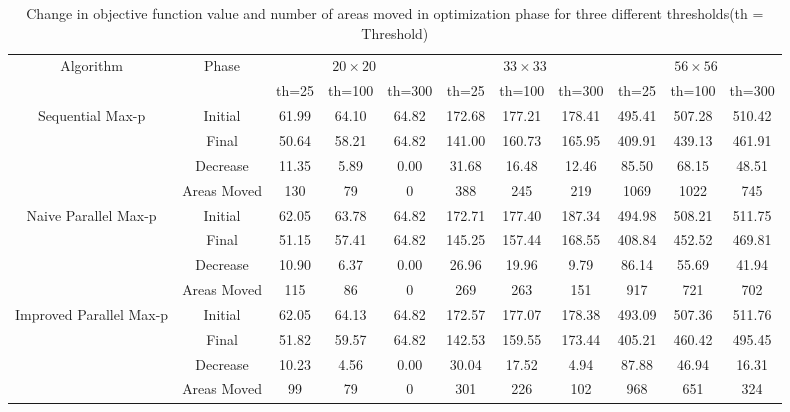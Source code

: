 \documentclass[conference]{IEEEtran}
\begin{document}
\begin{table}[!htbp]
\begin{center}
\begin{tabular}{|c|c|c|c|c|c|c|c|c|c|c|}
\hline 
\multirow{2}{*}{Algorithm}&\multirow{2}{*}{Phase} & \multicolumn{3}{|c|}{$20\times 20$} & \multicolumn{3}{|c|}{$33\times33$} & \multicolumn{3}{|c|}{$56\times56$}\\
\cline{3-11}
	& & th=25 & th=100 & th=300  & th=25 & th=100 & th=300  & th=25 & th=100 & th=300\\
\cline{1-11}
\multirow{3}{*}{Sequential Max-p}& Initial  & 61.99& 64.10 & 64.82 & 172.68 & 177.21 &178.41 &495.41 &507.28 &510.42 \\
\cline{2-11}
 & Final& 50.64 & 58.21 & 64.82 & 141.00 & 160.73 &165.95 &409.91 &439.13 &461.91 \\
\cline{2-11}
 & Decrease& 11.35 & 5.89 & 0.00 & 31.68 & 16.48 &12.46 &85.50 &68.15 &48.51\\
\cline{2-11}
 & Areas Moved& 130 & 79 & 0 & 388 & 245 &219 &1069 &1022 &745\\
\hline
\hline

\multirow{4}{*}{Naive Parallel Max-p}  &Initial  & 62.05& 63.78 & 64.82 & 172.71 & 177.40 &187.34 &494.98 &508.21 &511.75 \\
\cline{2-11}
 & Final& 51.15 & 57.41 & 64.82 & 145.25 & 157.44 &168.55 &408.84 &452.52 &469.81 \\
\cline{2-11}
 & Decrease& 10.90 & 6.37 & 0.00 & 26.96 & 19.96 &9.79 &86.14 &55.69 &41.94\\
\cline{2-11}
 & Areas Moved& 115 & 86 & 0 & 269 & 263 &151 &917 &721 &702\\
\hline
\hline

\multirow{4}{*}{Improved Parallel Max-p} &Initial  & 62.05& 64.13 & 64.82 & 172.57 & 177.07 &178.38 &493.09 &507.36 &511.76 \\
\cline{2-11}
 & Final& 51.82 & 59.57 & 64.82 & 142.53 & 159.55 &173.44 &405.21 &460.42 &495.45 \\
\cline{2-11}
 & Decrease& 10.23 & 4.56 & 0.00 & 30.04 & 17.52 &4.94 &87.88 &46.94 &16.31\\
\cline{2-11}
 & Areas Moved& 99 & 79 & 0 & 301 & 226 &102 &968 &651 &324\\
\hline


\end{tabular}
\caption{Change in objective function value and number of areas moved in optimization phase for three different thresholds(th = Threshold)}
\label{tab:tab7}
\end{center}
\end{table}
\end{document}
